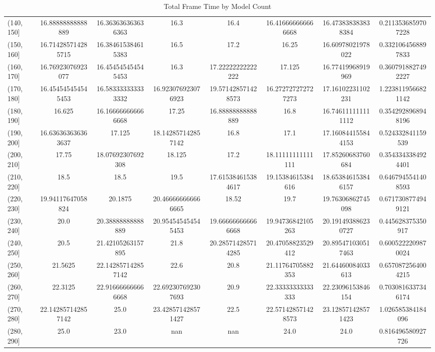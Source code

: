 \begin{table}[H]
\begin{tabular}{|l |c |c |c |c |c |c |c|}
(140, 150] & 16.88888888888889 & 16.363636363636363 & 16.3 & 16.4 & 16.416666666666668 & 16.473838383838384 & 0.2113536859707228 \\
(150, 160] & 16.714285714285715 & 16.384615384615383 & 16.5 & 17.2 & 16.25 & 16.60978021978022 & 0.3321064568897833 \\
(160, 170] & 16.76923076923077 & 16.454545454545453 & 16.3 & 17.22222222222222 & 17.125 & 16.77419968919969 & 0.3607918827492227 \\
(170, 180] & 16.454545454545453 & 16.583333333333332 & 16.923076923076923 & 19.571428571428573 & 16.272727272727273 & 17.16102231102231 & 1.2238119566821142 \\
(180, 190] & 16.625 & 16.166666666666668 & 17.25 & 16.88888888888889 & 16.8 & 16.746111111111112 & 0.3542928968948196 \\
(190, 200] & 16.636363636363637 & 17.125 & 18.142857142857142 & 16.8 & 17.1 & 17.160844155844153 & 0.524332841159539 \\
(200, 210] & 17.75 & 18.07692307692308 & 18.125 & 17.2 & 18.11111111111111 & 17.85260683760684 & 0.3543343384924401 \\
(210, 220] & 18.5 & 18.5 & 19.5 & 17.615384615384617 & 19.15384615384616 & 18.653846153846157 & 0.6467945541408593 \\
(220, 230] & 19.94117647058824 & 20.1875 & 20.466666666666665 & 18.52 & 19.7 & 19.76306862745098 & 0.6717308774949121 \\
(230, 240] & 20.0 & 20.38888888888889 & 20.954545454545453 & 19.666666666666668 & 19.94736842105263 & 20.191493886230727 & 0.445628375350917 \\
(240, 250] & 20.5 & 21.42105263157895 & 21.8 & 20.285714285714285 & 20.47058823529412 & 20.895471030517463 & 0.6005222209870024 \\
(250, 260] & 21.5625 & 22.142857142857142 & 22.6 & 20.8 & 21.11764705882353 & 21.64460084033613 & 0.6570872564004215 \\
(260, 270] & 22.3125 & 22.916666666666668 & 22.692307692307693 & 20.9 & 22.33333333333333 & 22.23096153846154 & 0.7030816337346174 \\
(270, 280] & 22.142857142857142 & 25.0 & 23.428571428571427 & 22.5 & 22.571428571428573 & 23.128571428571423 & 1.026585384184096 \\
(280, 290] & 25.0 & 23.0 & nan & nan & 24.0 & 24.0 & 0.816496580927726 \\
\hline
\end{tabular}
\caption{Total Frame Time by Model Count}
\label{tab:total_frame_time}
\end{table}



